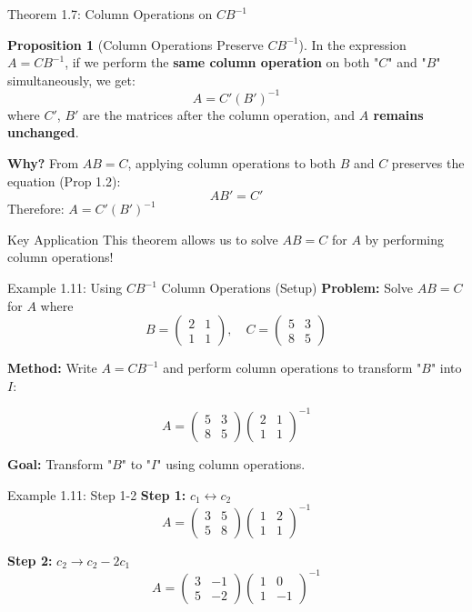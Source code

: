 \documentclass[10pt]{beamer}
\theoremstyle{definition}
\newtheorem{prop}{Proposition}[section]
\newcommand{\x}[1]{\alert{\textbf{#1}}}
\begin{document}
\begin{frame}{Theorem 1.7: Column Operations on $CB^{-1}$}
\begin{prop}[Column Operations Preserve $CB^{-1}$]
In the expression $A = CB^{-1}$, if we perform the \x{same column operation} on both "$C$" and "$B$" simultaneously, we get:
$$A = C'(B')^{-1}$$
where $C'$, $B'$ are the matrices after the column operation, and \x{$A$ remains unchanged}.
\end{prop}

\vspace{0.3cm}
\textbf{Why?} From $AB = C$, applying column operations to both $B$ and $C$ preserves the equation (Prop 1.2):
$$AB' = C'$$
Therefore: $A = C'(B')^{-1}$

\vspace{0.3cm}
\begin{alertblock}{Key Application}
This theorem allows us to solve $AB = C$ for $A$ by performing column operations!
\end{alertblock}
\end{frame}

\begin{frame}{Example 1.11: Using $CB^{-1}$ Column Operations (Setup)}
\textbf{Problem:} Solve $AB = C$ for $A$ where
$$B = \begin{pmatrix} 2 & 1 \\ 1 & 1 \end{pmatrix}, \quad C = \begin{pmatrix} 5 & 3 \\ 8 & 5 \end{pmatrix}$$

\textbf{Method:} Write $A = CB^{-1}$ and perform column operations to transform "$B$" into $I$:

$$A = \begin{pmatrix} 5 & 3 \\ 8 & 5 \end{pmatrix} \begin{pmatrix} 2 & 1 \\ 1 & 1 \end{pmatrix}^{-1}$$

\textbf{Goal:} Transform "$B$" to "$I$" using column operations.
\end{frame}

\begin{frame}{Example 1.11: Step 1-2}
\textbf{Step 1:} $c_1 \leftrightarrow c_2$
$$A = \begin{pmatrix} 3 & 5 \\ 5 & 8 \end{pmatrix} \begin{pmatrix} 1 & 2 \\ 1 & 1 \end{pmatrix}^{-1}$$

\textbf{Step 2:} $c_2 \to c_2 - 2c_1$
$$A = \begin{pmatrix} 3 & -1 \\ 5 & -2 \end{pmatrix} \begin{pmatrix} 1 & 0 \\ 1 & -1 \end{pmatrix}^{-1}$$
\end{frame}
\end{document}

